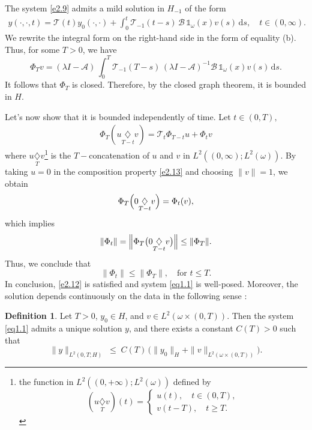 \documentclass[10pt, a4]{amsart}
\makeatletter
\theoremstyle{plain}
\theoremstyle{definition}
\newtheorem{definition}[lemma]{Definition}
\theoremstyle{remark}
\renewenvironment{proof}[1][\proofname]{\par
  \pushQED{\qed}%
  \normalfont \topsep6\p@\@plus6\p@\relax
  \trivlist
  \item[\hskip\labelsep
        \itshape
    #1\ \ref{#1}.]\ignorespaces
}{%
  \popQED\endtrivlist\@endpefalse
}
\numberwithin{equation}{section}
\makeatother
\begin{document}
\begin{proof}[of Lemma \ref{l2.5}]
The system \eqref{e2.9} admits a mild solution in \(H_{-1}\) of the form
\begin{align}\label{ee2.13}
    y(\cdot,\cdot,t)=\mathcal{T}(t)y_0(\cdot,\cdot)+\int_0^t \mathcal{T}_{-1}(t-s)\,\mathcal{B}\,\mathds{1}_{\omega}(x)v(s)\,\mathrm{d}s,\quad t\in (0,\infty).
\end{align}
We rewrite the integral form on the right-hand side in the form of equality (b). Thus, for some \(T>0\), we have
\[
\Phi_Tv= (\lambda I-\mathcal{A})\,\int_0^T \mathcal{T}_{-1}(T-s)\,(\lambda I-\mathcal{A})^{-1}\mathcal{B}\,\mathds{1}_{\omega}(x)v(s)\,\mathrm{d}s.
\]
It follows that \(\Phi_T\) is closed. Therefore, by the closed graph theorem, it is bounded in \(H\).

Let's now show that it is bounded independently of time.  Let $t\in (0,T),$
\begin{align}\label{e2.13}
    \Phi_{T}(u\underset{T-t}{\diamondsuit} v)=\mathcal{T}_{t}\Phi_{T-t}u+\Phi_{t}v
\end{align}
 where $u\underset{T}{\diamondsuit}v$\footnote{the function in $L^2((0,+\infty); L^2(\omega))$ defined by \begin{equation*}
(u\underset{T}{\diamondsuit}v)(t)=\left\lbrace 
\begin{array}{ll}
u(t),\quad t\in (0,T),\\
v(t-T),\quad t\geq T.
\end{array}
\right.
\end{equation*}} is the $T-$concatenation of $u$ and $v$ in $L^2((0,\infty); L^2(\omega)).$ By taking \( u=0 \) in the composition property \eqref{e2.13} and choosing \(\|v\| = 1\), we obtain
\[
\Phi_{T}\Bigl(0\underset{T-t}{\diamondsuit} v\Bigr) = \Phi_{t}(v),
\]
which implies
\[
\|\Phi_{t}\| = \Bigl\|\Phi_{T}\bigl(0\underset{T-t}{\diamondsuit} v\bigr)\Bigr\| \leq \|\Phi_{T}\|.
\]
Thus, we conclude that
\[
\|\Phi_{t}\| \leq \|\Phi_{T}\|, \quad \text{for } t \leq T.
\]
In conclusion, \eqref{e2.12} is satisfied and system \eqref{eq1.1} is well-posed.
\end{proof}
Moreover, the solution depends continuously on the data in the following sense :
\begin{definition}\label{d2.6}
  Let \(T>0\), \(y_0\in H\), and \(v\in L^2(\omega\times(0,T))\). Then the system \eqref{eq1.1} admits a unique solution \(y\), and there exists a constant \(C(T)>0\) such that
  \[
    \|y\|_{L^2(0,T;H)}
    \;\le\;
    C(T)\,\bigl(\|y_0\|_H + \|v\|_{L^2(\omega\times(0,T))}\bigr).
  \]
\end{definition}
\end{document}
